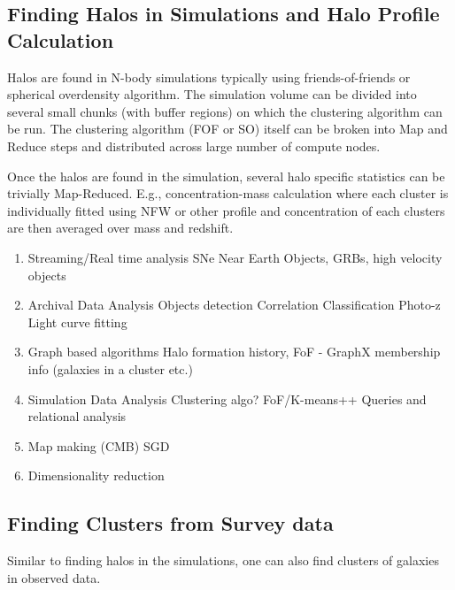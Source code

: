 \documentclass[twocolumn, prd]{revtex4}
\begin{document}
\subsection{Finding Halos in Simulations and Halo Profile Calculation}
Halos are found in N-body simulations typically using friends-of-friends or spherical overdensity algorithm. The simulation volume can be divided into several small chunks (with buffer regions) on which the clustering algorithm can be run. The clustering algorithm (FOF or SO) itself can be broken into Map and Reduce steps and distributed across large number of compute nodes. 

Once the halos are found in the simulation, several halo specific statistics can be trivially Map-Reduced. E.g., concentration-mass calculation where each cluster is individually fitted using NFW or other profile and concentration of each clusters are then averaged over mass and redshift. 
\begin{enumerate}
\item Streaming/Real time analysis
	\subitem SNe
	\subitem  Near Earth Objects, GRBs, high velocity objects
\item Archival Data Analysis 
	\subitem  Objects detection 
	\subitem Correlation 
	\subitem Classification 
	\subitem  Photo-z 
	\subitem Light curve fitting 
\item Graph based algorithms 
\subitem Halo formation history, FoF - GraphX 
\subitem membership info (galaxies in a cluster etc.)
\item Simulation Data Analysis
\subitem Clustering algo? FoF/K-means++
\subitem Queries and relational analysis
\item Map making (CMB) SGD 
\item Dimensionality reduction
\end{enumerate}

\subsection{Finding Clusters from Survey data}
Similar to finding halos in the simulations, one can also find clusters of galaxies in observed data.



\end{document}
